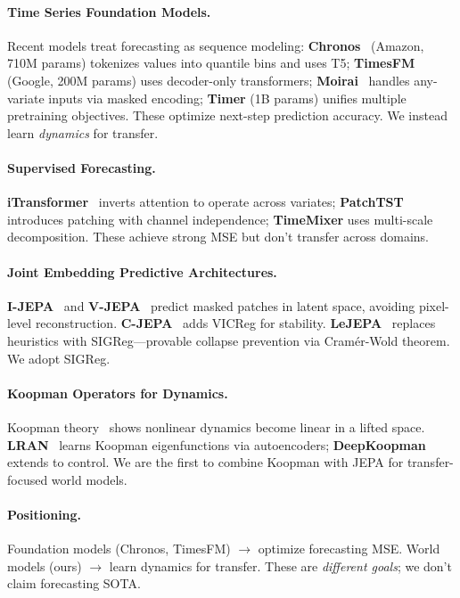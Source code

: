 \documentclass{article}
\begin{document}
\paragraph{Time Series Foundation Models.}
Recent models treat forecasting as sequence modeling:
\textbf{Chronos}~\cite{chronos} (Amazon, 710M params) tokenizes values into quantile bins and uses T5;
\textbf{TimesFM} (Google, 200M params) uses decoder-only transformers;
\textbf{Moirai}~\cite{moirai} handles any-variate inputs via masked encoding;
\textbf{Timer} (1B params) unifies multiple pretraining objectives.
These optimize next-step prediction accuracy. We instead learn \emph{dynamics} for transfer.

\paragraph{Supervised Forecasting.}
\textbf{iTransformer}~\cite{itransformer} inverts attention to operate across variates;
\textbf{PatchTST}~\cite{patchtst} introduces patching with channel independence;
\textbf{TimeMixer} uses multi-scale decomposition.
These achieve strong MSE but don't transfer across domains.

\paragraph{Joint Embedding Predictive Architectures.}
\textbf{I-JEPA}~\cite{ijepa} and \textbf{V-JEPA}~\cite{vjepa} predict masked patches in latent space, avoiding pixel-level reconstruction.
\textbf{C-JEPA}~\cite{cjepa} adds VICReg for stability.
\textbf{LeJEPA}~\cite{lejepa2024} replaces heuristics with SIGReg—provable collapse prevention via Cramér-Wold theorem. We adopt SIGReg.

\paragraph{Koopman Operators for Dynamics.}
Koopman theory~\cite{koopman1931,brunton2021modern} shows nonlinear dynamics become linear in a lifted space.
\textbf{LRAN}~\cite{lusch2018deep} learns Koopman eigenfunctions via autoencoders;
\textbf{DeepKoopman} extends to control.
We are the first to combine Koopman with JEPA for transfer-focused world models.

\paragraph{Positioning.}
Foundation models (Chronos, TimesFM) $\rightarrow$ optimize forecasting MSE.
World models (ours) $\rightarrow$ learn dynamics for transfer.
These are \emph{different goals}; we don't claim forecasting SOTA.
\end{document}
